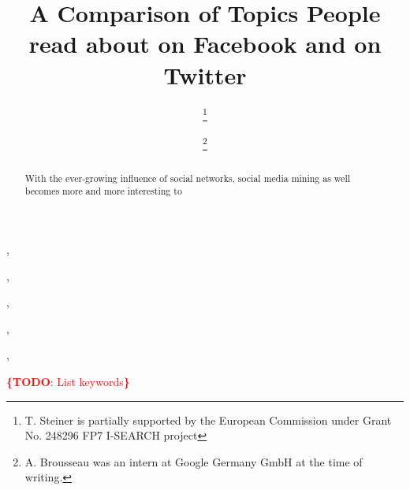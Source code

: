 \documentclass{iosart2c}
\newcommand{\todo}[1]{\noindent\textcolor{red}{{\bf \{TODO}: #1{\bf \}}}}
\begin{document}
\begin{frontmatter}

\title{A Comparison of Topics People read about on Facebook and on Twitter
}




\author[A]{ \thanks{T. Steiner is partially supported by the European Commission under Grant No. 248296 FP7 I-SEARCH project}},
\author[B]{ },
\author[A]{ \thanks{A. Brousseau was an intern at Google Germany GmbH at the time of writing.}},
\author[C]{ },
\author[B]{ },
\author[D]{ }


\address[A]{Google Germany GmbH, ABC-Str. 19, 20354 Hamburg, Germany,\\
E-mail: tomac@google.com, arnaud.brousseau@gmail.com}
\address[B]{Ghent University -- IBBT, ELIS, Multimedia Lab, Gaston Crommenlaan 8/201, 9050 Ghent, Belgium,\\
E-mail: ruben.verborgh@ugent.be, rik.vandewalle@ugent.be}
\address[C]{EURECOM, Sophia Antipolis, France\\
E-mail: raphael.troncy@eurecom.fr}
\address[D]{Universitat Polit\`{e}cnica de Catalunya, Department LSI, 08034 Barcelona, Spain,\\
E-mail: gabarro@lsi.upc.edu}

\begin{abstract}
With the ever-growing influence of social networks, social media mining as well becomes more and more interesting to  
\end{abstract}

\begin{keyword}
\todo{List keywords}
\end{keyword}

\end{frontmatter}

\end{document}

